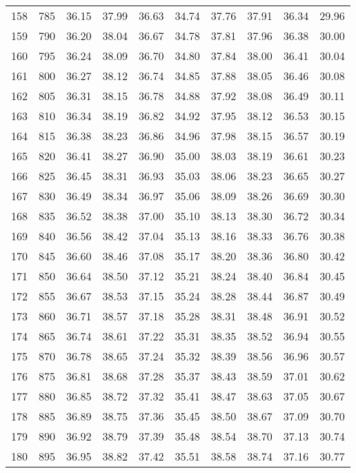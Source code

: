 \begin{longtable}{rrllllllll}
158 & 785 & 36.15 & 37.99 & 36.63 & 34.74 & 37.76 & 37.91 & 36.34 & 29.96 \\ 
159 & 790 & 36.20 & 38.04 & 36.67 & 34.78 & 37.81 & 37.96 & 36.38 & 30.00 \\ 
160 & 795 & 36.24 & 38.09 & 36.70 & 34.80 & 37.84 & 38.00 & 36.41 & 30.04 \\ 
161 & 800 & 36.27 & 38.12 & 36.74 & 34.85 & 37.88 & 38.05 & 36.46 & 30.08 \\ 
162 & 805 & 36.31 & 38.15 & 36.78 & 34.88 & 37.92 & 38.08 & 36.49 & 30.11 \\ 
163 & 810 & 36.34 & 38.19 & 36.82 & 34.92 & 37.95 & 38.12 & 36.53 & 30.15 \\ 
164 & 815 & 36.38 & 38.23 & 36.86 & 34.96 & 37.98 & 38.15 & 36.57 & 30.19 \\ 
165 & 820 & 36.41 & 38.27 & 36.90 & 35.00 & 38.03 & 38.19 & 36.61 & 30.23 \\ 
166 & 825 & 36.45 & 38.31 & 36.93 & 35.03 & 38.06 & 38.23 & 36.65 & 30.27 \\ 
167 & 830 & 36.49 & 38.34 & 36.97 & 35.06 & 38.09 & 38.26 & 36.69 & 30.30 \\ 
168 & 835 & 36.52 & 38.38 & 37.00 & 35.10 & 38.13 & 38.30 & 36.72 & 30.34 \\ 
169 & 840 & 36.56 & 38.42 & 37.04 & 35.13 & 38.16 & 38.33 & 36.76 & 30.38 \\ 
170 & 845 & 36.60 & 38.46 & 37.08 & 35.17 & 38.20 & 38.36 & 36.80 & 30.42 \\ 
171 & 850 & 36.64 & 38.50 & 37.12 & 35.21 & 38.24 & 38.40 & 36.84 & 30.45 \\ 
172 & 855 & 36.67 & 38.53 & 37.15 & 35.24 & 38.28 & 38.44 & 36.87 & 30.49 \\ 
173 & 860 & 36.71 & 38.57 & 37.18 & 35.28 & 38.31 & 38.48 & 36.91 & 30.52 \\ 
174 & 865 & 36.74 & 38.61 & 37.22 & 35.31 & 38.35 & 38.52 & 36.94 & 30.55 \\ 
175 & 870 & 36.78 & 38.65 & 37.24 & 35.32 & 38.39 & 38.56 & 36.96 & 30.57 \\ 
176 & 875 & 36.81 & 38.68 & 37.28 & 35.37 & 38.43 & 38.59 & 37.01 & 30.62 \\ 
177 & 880 & 36.85 & 38.72 & 37.32 & 35.41 & 38.47 & 38.63 & 37.05 & 30.67 \\ 
178 & 885 & 36.89 & 38.75 & 37.36 & 35.45 & 38.50 & 38.67 & 37.09 & 30.70 \\ 
179 & 890 & 36.92 & 38.79 & 37.39 & 35.48 & 38.54 & 38.70 & 37.13 & 30.74 \\ 
180 & 895 & 36.95 & 38.82 & 37.42 & 35.51 & 38.58 & 38.74 & 37.16 & 30.77 \\ 

\end{longtable}
